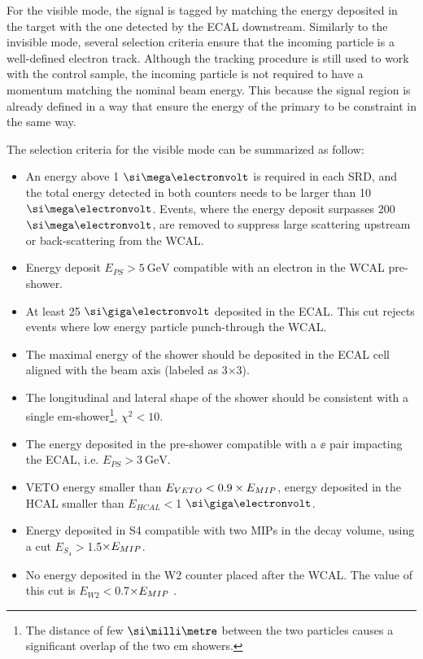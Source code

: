 For the visible mode, the signal is tagged by matching the energy deposited in the target with the one detected by the ECAL downstream. Similarly to the invisible mode, several selection criteria ensure that the incoming particle is a well-defined electron track. Although the tracking procedure is still used to work with the control sample, the incoming particle is not required to have a momentum matching the nominal beam energy. This because the signal region is already defined in a way that ensure the energy of the primary to be constraint in the same way.

The selection criteria for the visible mode can be summarized as follow:

\begin{itemize}
\item An energy above 1 $\mev$ is required in each SRD, and the total energy detected in both counters needs to be larger than 10 $\mev$. Events, where the energy deposit surpasses 200 $\mev$, are removed to suppress large scattering upstream or back-scattering from the WCAL.
\item Energy deposit $E_{PS} > \SI{5}{\giga\electronvolt}$ compatible with an electron in the WCAL pre-shower.
\item At least 25 $\gev$ deposited in the ECAL. This cut rejects events where low energy particle punch-through the WCAL.
\item The maximal energy of the shower should be deposited in the ECAL cell aligned with the beam axis (labeled as 3$\times$3). 
\item The longitudinal and lateral shape of the shower should be consistent with a single em-shower\footnote{The distance of few $\mmi$ between the two particles causes a significant overlap of the two em showers.}, $\chi^2 < 10$.
\item The energy deposited in the pre-shower compatible with a $\ee$ pair impacting the ECAL, i.e. $E_{PS} > \SI{3}{\giga\electronvolt}$.
\item VETO energy smaller than $E_{VETO} < 0.9\times E_{MIP}$, energy deposited in the HCAL smaller than $E_{HCAL}<$1 $\gev$.
\item Energy deposited in S4 compatible with two MIPs in the decay volume, using a cut $E_{S_4} > $1.5$\times E_{MIP}$.
\item  No energy deposited in the W2 counter placed after the WCAL. The value of this cut is $E_{W2} < $0.7$\times E_{MIP}$ \cite{Banerjee:2019hmi}.
\end{itemize}

